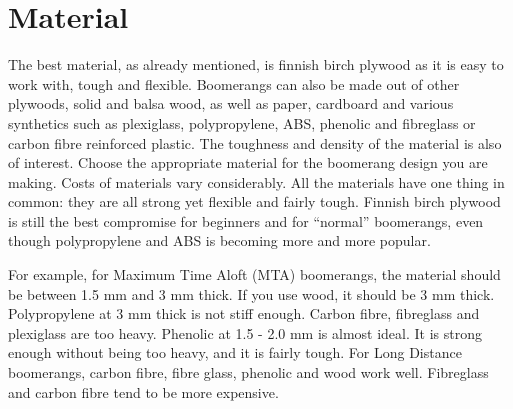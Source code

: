 \section{Material}
The best material, as already mentioned, is finnish birch plywood as it is easy to work with, tough and flexible. Boomerangs can also be made out of other plywoods, solid and balsa wood, as well as paper, cardboard and various synthetics such as plexiglass, polypropylene, ABS, phenolic and fibreglass or carbon fibre reinforced plastic. The toughness and density of the material is also of interest. Choose the appropriate material for the boomerang design you are making. Costs of materials vary considerably. All the materials have one thing in common: they are all strong yet flexible and fairly tough. Finnish birch plywood is still the best compromise for beginners and for ``normal'' boomerangs, even though polypropylene and ABS is becoming more and more popular.

For example, for Maximum Time Aloft (MTA) boomerangs, the material should be between 1.5 mm and 3 mm thick. If you use wood, it should be 3 mm thick. Polypropylene at 3 mm thick is not stiff enough. Carbon fibre, fibreglass and plexiglass are too heavy. Phenolic at 1.5 - 2.0 mm is almost ideal. It is strong enough without being too heavy, and it is fairly tough. 
For Long Distance boomerangs, carbon fibre, fibre glass, phenolic and wood work well. Fibreglass and carbon fibre tend to be more expensive.
\newpage


